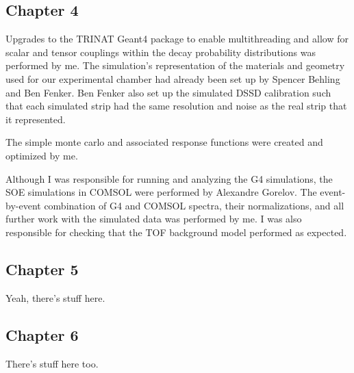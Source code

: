 \subsection*{Chapter 4}
Upgrades to the TRINAT Geant4 package to enable multithreading and allow for scalar and tensor couplings within the decay probability distributions was performed by me.  The simulation's representation of the materials and geometry used for our experimental chamber had already been set up by Spencer Behling and Ben Fenker.  Ben Fenker also set up the simulated DSSD calibration such that each simulated strip had the same resolution and noise as the real strip that it represented.  

The simple monte carlo and associated response functions were created and optimized by me.  

Although I was responsible for running and analyzing the G4 simulations, the SOE simulations in COMSOL were performed by Alexandre Gorelov.  The event-by-event combination of G4 and COMSOL spectra, their normalizations, and all further work with the simulated data was performed by me.  I was also responsible for checking that the TOF background model performed as expected.  
\subsection*{Chapter 5}
Yeah, there's stuff here.
\subsection*{Chapter 6}
There's stuff here too. 

